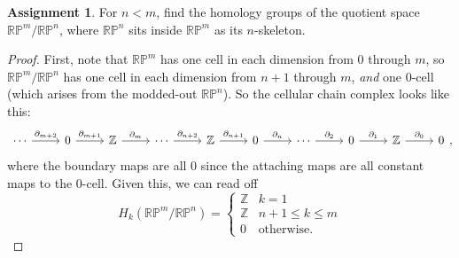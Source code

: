 \documentclass[12pt]{article}
\theoremstyle{definition}
\newtheorem{ex}{Assignment}
\begin{document}
\begin{ex}
	For $n < m$, find the homology groups of the quotient space $\mathbb{RP}^m/\mathbb{RP}^n$, where $\mathbb{RP}^n$ sits inside $\mathbb{RP}^m$ as its $n$-skeleton.
\end{ex}
\begin{proof}
	First, note that $\mathbb{RP}^m$ has one cell in each dimension from 0 through $m$, so $\mathbb{RP}^m/\mathbb{RP}^n$ has one cell in each dimension from $n + 1$ through $m$, \textit{and} one 0-cell (which arises from the modded-out $\mathbb{RP}^n$).
	So the cellular chain complex looks like this: \begin{equation*}
		\begin{tikzcd}
			\cdots \arrow[r, "\partial_{m+2}"] & 0 \arrow[r, "\partial_{m+1}"] & \mathbb{Z} \arrow[r, "\partial_m"] & \cdots \arrow[r, "\partial_{n+2}"] & \mathbb{Z} \arrow[r, "\partial_{n+1}"] & 0 \arrow[r, "\partial_n"] & \cdots \arrow[r, "\partial_2"] & 0 \arrow[r, "\partial_1"] & \mathbb{Z} \arrow[r, "\partial_0"] & 0
		\end{tikzcd},
	\end{equation*}
	where the boundary maps are all 0 since the attaching maps are all constant maps to the 0-cell.
	Given this, we can read off \begin{equation*}
		H_k\left(\mathbb{RP}^m/\mathbb{RP}^n\right) = \begin{cases}
			\mathbb{Z} & k = 1               \\
			\mathbb{Z} & n + 1 \leq k \leq m \\
			0          & \text{otherwise}.
		\end{cases}
	\end{equation*}
\end{proof}
\end{document}
